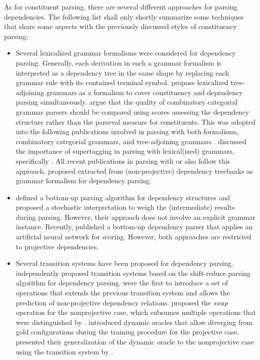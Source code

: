 \documentclass[../document.tex]{subfiles}
\begin{document}
    As for constituent parsing, there are several different approaches for parsing dependencies.
    The following list shall only shortly summarize some techniques that share some aspects with the previously discussed styles of constituency parsing:
    \begin{itemize}
        \item Several lexicalized grammar formalisms were considered for dependency parsing. Generally, each derivation in such a grammar formalism is interpreted as a dependency tree in the same shape by replacing each grammar rule with its contained terminal symbol. \citet{chiang2000statistical} propose lexicalized tree-adjoining grammars as a formalism to cover constituency and dependency parsing simultaneously. \citet{hockenmaier2002generative} argue that the quality of combinatory categorial grammar parsers should be compared using scores assessing the dependency structure rather than the parseval measure for constituents. This was adopted into the following publications involved in parsing with both formalisms, combinatory categorial grammars, and tree-adjoining grammars \citep{Kas17,Bla18}. \citet{Clark04} discussed the importance of supertagging in parsing with lexical(ized) grammars, specifically . All recent publications in parsing with  or  also follow this approach. \citep{Kas17,LewisSteedman14}   
        \citet{kuhlmann2009treebank} proposed  extracted from (non-projective) dependency treebanks as grammar formalism for dependency parsing.
        \item \citet{eisner-1996-three} defined a bottom-up parsing algorithm for dependency structures and proposed a stochastic interpretation to weigh the (intermediate) results during parsing. However, their approach does not involve an explicit grammar instance. Recently, \citet{yang-tu-2022-headed} published a bottom-up dependency parser that applies an artificial neural network for scoring. However, both approaches are restricted to projective dependencies.
        \item Several transition systems have been proposed for dependency parsing. \citet{nivre-2003-efficient, yamada-matsumoto-2003-statistical} independently proposed transition systems based on the shift-reduce parsing algorithm for dependency parsing. \citet{attardi-2006-experiments} were the first to introduce a set of operations that extends the previous transition system and allows the prediction of non-projective dependency relations. \citet{nivre-2009-non} proposed the \emph{swap} operation for the nonprojective case, which subsumes multiple operations that were distinguished by \citet{attardi-2006-experiments}. \citet{Goldberg12} introduced dynamic oracles that allow diverging from gold configurations during the training procedure for the projective case. \citet{gomez2014polynomial} presented their generalization of the dynamic oracle to the nonprojective case using the transition system by \citet{attardi-2006-experiments}.
    \end{itemize}
\end{document}
